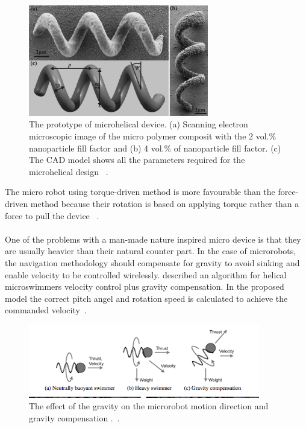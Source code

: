 \documentclass[a4paper,11pt]{article}
\begin{document}
\begin{sloppypar}
\begin{figure}
  \centering
    \includegraphics[width=0.7\textwidth]{8}
  \caption{ The prototype of microhelical device. (a) Scanning electron microscopic image of the micro polymer composit
with the 2 vol.\% nanoparticle fill factor and (b) 4 vol.\% of nanoparticle fill factor. (c) The CAD model
shows all the parameters required for the microhelical design ~\citep{peyer2013bacteria}.}
  \label{ref8}
\end{figure}


The micro robot using torque-driven method is more favourable than the force-driven method 
because their rotation is based on applying torque rather than a force to pull the device ~\citep{peyer2013bacteria}. 

\paragraph{}
One of the problems with a man-made nature inspired micro device is that they are 
usually heavier than their natural counter part. In the case of microrobots, the navigation methodology should compensate for gravity to avoid sinking and enable velocity to be 
controlled wirelessly. \citeauthor{mahoney2011velocity} described an algorithm for helical microswimmers velocity 
control plus gravity compensation. In the proposed model the correct pitch angel and 
rotation speed is calculated to achieve the commanded velocity~\citep{mahoney2011velocity}.

\begin{figure}
  \centering
    \includegraphics[width=0.9\textwidth]{11}
  \caption{The effect of the gravity on the microrobot motion direction and gravity compensation .~\citep{mahoney2011velocity}.}
  \label{11}
\end{figure}




\end{sloppypar}
\end{document}
